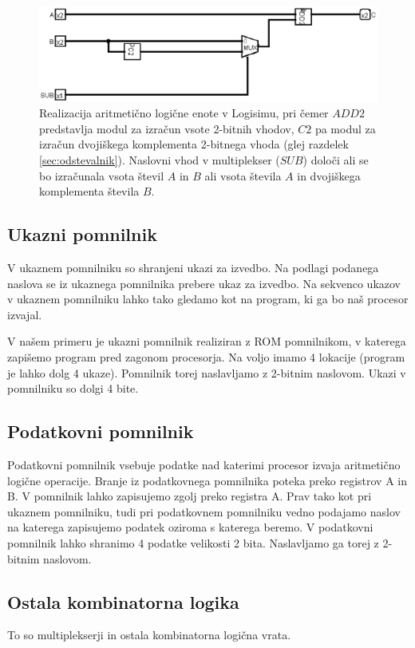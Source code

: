 \begin{figure}[htbf]%
\begin{center}
\includegraphics[width=0.75\columnwidth]{procesor/img/ALU}%
\caption{Realizacija aritmetično logične enote v Logisimu, pri čemer $ADD2$ predstavlja modul za izračun vsote 2-bitnih vhodov, $C2$ pa modul za izračun dvojiškega komplementa 2-bitnega vhoda (glej razdelek \ref{sec:odstevalnik}). Naslovni vhod v multiplekser ($SUB$) določi ali se bo izračunala vsota števil $A$ in $B$ ali vsota števila $A$ in dvojiškega komplementa števila $B$.}%
\label{fig:ALU}%
\end{center}
\end{figure}

\subsection{Ukazni pomnilnik}
V ukaznem pomnilniku so shranjeni ukazi za izvedbo. Na podlagi podanega naslova se iz ukaznega pomnilnika prebere ukaz za izvedbo. Na sekvenco ukazov v ukaznem pomnilniku lahko tako gledamo kot na program, ki ga bo naš procesor izvajal.

V našem primeru je ukazni pomnilnik realiziran z ROM pomnilnikom, v katerega zapišemo program pred zagonom procesorja. Na voljo imamo 4 lokacije (program je lahko dolg 4 ukaze). Pomnilnik torej naslavljamo z 2-bitnim naslovom. Ukazi v pomnilniku so dolgi 4 bite. 

\subsection{Podatkovni pomnilnik}
Podatkovni pomnilnik vsebuje podatke nad katerimi procesor izvaja aritmetično logične operacije. Branje iz podatkovnega pomnilnika poteka preko registrov A in B. V pomnilnik lahko zapisujemo zgolj preko registra A. Prav tako kot pri ukaznem pomnilniku, tudi pri podatkovnem pomnilniku vedno podajamo naslov na katerega zapisujemo podatek oziroma s katerega beremo. V podatkovni pomnilnik lahko shranimo 4 podatke velikosti 2 bita. Naslavljamo ga torej z 2-bitnim naslovom.

\subsection{Ostala kombinatorna logika}
To so multiplekserji in ostala kombinatorna logična vrata.

